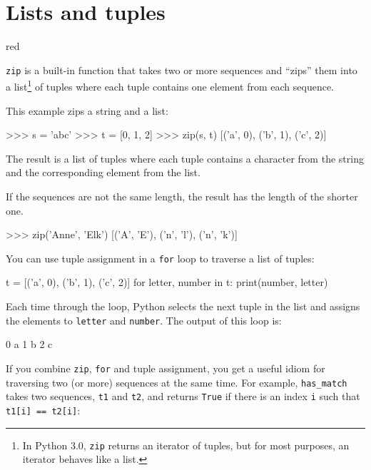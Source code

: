 \section{Lists and tuples}
\begin{color}{red}


{\tt zip} is a built-in function that takes two or more sequences and
``zips'' them into a list\footnote{In Python 3.0, {\tt zip} returns an
  iterator of tuples, but for most purposes, an iterator behaves like
  a list.} of tuples where each tuple contains one element from each
sequence.


This example zips a string and a list:

\beforeverb
\begin{pycode}
>>> s = 'abc'
>>> t = [0, 1, 2]
>>> zip(s, t)
[('a', 0), ('b', 1), ('c', 2)]
\end{pycode}
\afterverb
%
The result is a list of tuples where each tuple contains
a character from the string and the corresponding element from
the list.


If the sequences are not the same length, the result has the
length of the shorter one.

\beforeverb
\begin{pycode}
>>> zip('Anne', 'Elk')
[('A', 'E'), ('n', 'l'), ('n', 'k')]
\end{pycode}
\afterverb

\end{color}
%
You can use tuple assignment in a {\tt for} loop to traverse a list of
tuples:


\beforeverb
\begin{pycode}
t = [('a', 0), ('b', 1), ('c', 2)]
for letter, number in t:
    print(number, letter)
\end{pycode}
\afterverb
%
Each time through the loop, Python selects the next tuple in
the list and assigns the elements to {\tt letter} and 
{\tt number}.  The output of this loop is:


\beforeverb
\begin{pyoutput}
0 a
1 b
2 c
\end{pyoutput}
\afterverb
%
If you combine {\tt zip}, {\tt for} and tuple assignment, you get a
useful idiom for traversing two (or more) sequences at the same
time.  For example, \verb"has_match" takes two sequences, {\tt t1} and
{\tt t2}, and returns {\tt True} if there is an index {\tt i}
such that {\tt t1[i] == t2[i]}:

